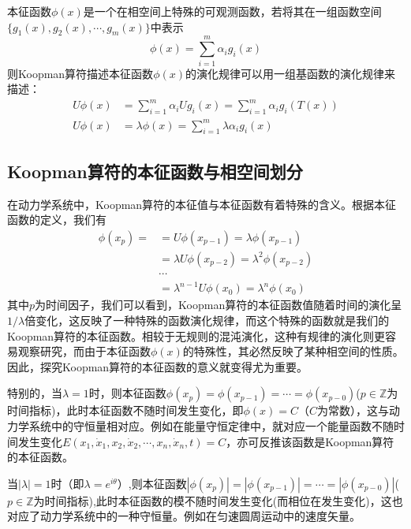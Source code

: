 本征函数$\phi(x)$是一个在相空间上特殊的可观测函数，若将其在一组函数空间$\{g_1(x),g_2(x),\cdots,g_m(x)\}$中表示
\begin{equation}
    \phi(x)=\sum_{i=1}^m\alpha_ig_i(x)
\end{equation}
则Koopman算符描述本征函数$\phi(x)$的演化规律可以用一组基函数的演化规律来描述：
\begin{equation}
    \begin{aligned}
        U\phi(x)&=\sum_{i=1}^m\alpha_iUg_i(x)=\sum_{i=1}^m\alpha_ig_i(T(x))\\
        U\phi(x)&=\lambda\phi(x)=\sum_{i=1}^m\lambda\alpha_ig_i(x)
    \end{aligned}
\end{equation}

\subsection{Koopman算符的本征函数与相空间划分}

在动力学系统中，Koopman算符的本征值与本征函数有着特殊的含义。根据本征函数的定义，我们有
\begin{equation}
    \begin{aligned}
        \phi(x_p)=  &=U\phi(x_{p-1})=\lambda\phi(x_{p-1})\\
                    &=\lambda U\phi(x_{p-2})=\lambda^2\phi(x_{p-2})\\
                    &\cdots\\
                    &=\lambda^{n-1}U\phi(x_0)=\lambda^n\phi(x_0)
    \end{aligned}
\end{equation}
其中$p$为时间因子，我们可以看到，Koopman算符的本征函数值随着时间的演化呈$1/\lambda$倍变化，这反映了一种特殊的函数演化规律，而这个特殊的函数就是我们的Koopman算符的本征函数。相较于无规则的混沌演化，这种有规律的演化则更容易观察研究，而由于本征函数$\phi(x)$的特殊性，其必然反映了某种相空间的性质。因此，探究Koopman算符的本征函数的意义就变得尤为重要。

特别的，当$\lambda=1$时，则本征函数$\phi(x_p)=\phi(x_{p-1})=\cdots=\phi(x_{p-0})$($p\in \mathbb{Z}$为时间指标)，此时本征函数不随时间发生变化，即$\phi(x)=C$（$C$为常数），这与动力学系统中的守恒量相对应。例如在能量守恒定律中，就对应一个能量函数不随时间发生变化$E(x_1,\dot{x}_1,x_2,\dot{x}_2,\cdots,x_n,\dot{x}_n,t)=C$，亦可反推该函数是Koopman算符的本征函数。

当$|\lambda|=1$时（即$\lambda=e^{i\theta}$）,则本征函数$|\phi(x_p)|=|\phi(x_{p-1})|=\cdots=|\phi(x_{p-0})|$($p\in \mathbb{Z}$为时间指标),此时本征函数的模不随时间发生变化(而相位在发生变化)，这也对应了动力学系统中的一种守恒量。例如在匀速圆周运动中的速度矢量。

